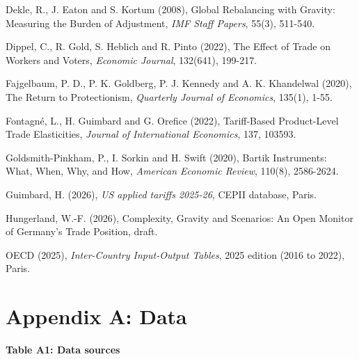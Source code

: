 \documentclass[
  11pt,
]{article}
\begin{document}
Dekle, R., J. Eaton and S. Kortum (2008), Global Rebalancing with
Gravity: Measuring the Burden of Adjustment, \emph{IMF Staff Papers},
55(3), 511-540.

Dippel, C., R. Gold, S. Heblich and R. Pinto (2022), The Effect of Trade
on Workers and Voters, \emph{Economic Journal}, 132(641), 199-217.

Fajgelbaum, P. D., P. K. Goldberg, P. J. Kennedy and A. K. Khandelwal
(2020), The Return to Protectionism, \emph{Quarterly Journal of
Economics}, 135(1), 1-55.

Fontagné, L., H. Guimbard and G. Orefice (2022), Tariff-Based
Product-Level Trade Elasticities, \emph{Journal of International
Economics}, 137, 103593.

Goldsmith-Pinkham, P., I. Sorkin and H. Swift (2020), Bartik
Instruments: What, When, Why, and How, \emph{American Economic Review},
110(8), 2586-2624.

Guimbard, H. (2026), \emph{US applied tariffs 2025-26}, CEPII database,
Paris.

Hungerland, W.-F. (2026), Complexity, Gravity and Scenarios: An Open
Monitor of Germany's Trade Position, draft.

OECD (2025), \emph{Inter-Country Input-Output Tables}, 2025 edition
(2016 to 2022), Paris.

\hypertarget{appendix-a-data}{%
\section{Appendix A: Data}\label{appendix-a-data}}

\textbf{Table A1: Data sources}
\end{document}
